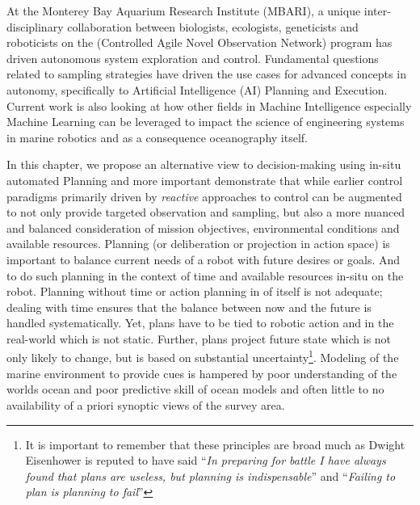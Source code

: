 At the Monterey Bay Aquarium Research Institute (MBARI), a unique
inter-disciplinary collaboration between biologists, ecologists,
geneticists and roboticists on the \can (Controlled Agile Novel
Observation Network) program \cite{canon} has driven autonomous system
exploration and control. Fundamental questions related to sampling
strategies have driven the use cases for advanced concepts in
autonomy, specifically to Artificial Intelligence (AI) Planning and
Execution. Current work is also looking at how other fields in Machine
Intelligence especially Machine Learning can be leveraged to impact
the science of engineering systems in marine robotics and as a
consequence oceanography itself.

In this chapter, we propose an alternative view to decision-making
using in-situ automated Planning \cite{ghallab04} and more important
demonstrate that while earlier control paradigms primarily driven by
\emph{reactive} approaches to control can be augmented to not only
provide targeted observation and sampling, but also a more nuanced and
balanced consideration of mission objectives, environmental conditions
and available resources. Planning (or deliberation or projection in
action space) is important to balance current needs of a robot with
future desires or goals. And to do such planning in the context of
time and available resources in-situ on the robot. Planning without
time or action planning in of itself is not adequate; dealing with
time ensures that the balance between now and the future is handled
systematically. Yet, plans have to be tied to robotic action and in
the real-world which is not static. Further, plans project future
state which is not only likely to change, but is based on substantial
uncertainty\footnote{It is important to remember that these principles
  are broad much as Dwight Eisenhower is reputed to have said
  ``\emph{In preparing for battle I have always found that plans are
    useless, but planning is indispensable}'' and ``\emph{Failing to
    plan is planning to fail}''}. Modeling of the marine environment
to provide cues is hampered by poor understanding of the worlds ocean
and poor predictive skill of ocean models and often little to no
availability of a priori synoptic views of the survey area. 

